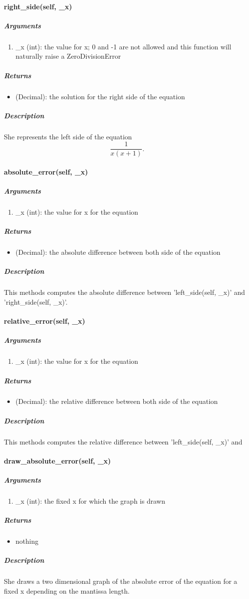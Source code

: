 \paragraph{right\_side(self, \_x)}
\subparagraph*{Arguments}
\begin{enumerate}
    \item \_x (int): the value for x; 0 and -1 are not allowed and this function will naturally raise a ZeroDivisionError
\end{enumerate}
\subparagraph*{Returns}
\begin{itemize}
    \item (Decimal): the solution for the right side of the equation
\end{itemize}
\subparagraph*{Description}
She represents the left side of the equation
\begin{equation*}
    \frac{1}{x (x + 1)} \text{.}
\end{equation*}
\paragraph{absolute\_error(self, \_x)}
\subparagraph*{Arguments}
\begin{enumerate}
    \item \_x (int): the value for x for the equation
\end{enumerate}
\subparagraph*{Returns}
\begin{itemize}
    \item (Decimal): the absolute difference between both side of the equation
\end{itemize}
\subparagraph*{Description}
This methods computes the absolute difference between 'left\_side(self, \_x)' and 'right\_side(self, \_x)'.
\paragraph{relative\_error(self, \_x)}
\subparagraph*{Arguments}
\begin{enumerate}
    \item \_x (int): the value for x for the equation
\end{enumerate}
\subparagraph*{Returns}
\begin{itemize}
    \item (Decimal): the relative difference between both side of the equation
\end{itemize}
\subparagraph*{Description}
This methods computes the relative difference between 'left\_side(self, \_x)' and
\paragraph{draw\_absolute\_error(self, \_x)}
\subparagraph*{Arguments}
\begin{enumerate}
    \item \_x (int): the fixed x for which the graph is drawn
\end{enumerate}
\subparagraph*{Returns}
\begin{itemize}
    \item nothing
\end{itemize}
\subparagraph*{Description}
She draws a two dimensional graph of the absolute error of the equation for a fixed x depending on the mantissa length.
